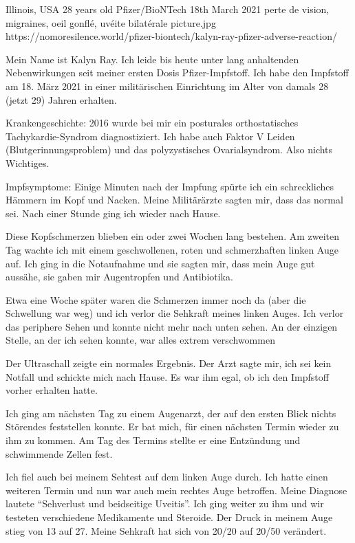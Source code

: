           {Illinois, USA}
          {28 years old}
          {Pfizer/BioNTech}
          {18th March 2021}
          {perte de vision, migraines, oeil gonflé, uvéite bilatérale}
          {picture.jpg}
          {https://nomoresilence.world/pfizer-biontech/kalyn-ray-pfizer-adverse-reaction/}
          {

\normalsize

Mein Name ist Kalyn Ray. Ich leide bis heute unter lang anhaltenden
Nebenwirkungen seit meiner ersten Dosis Pfizer-Impfstoff. Ich habe den Impfstoff
am 18. März 2021 in einer militärischen Einrichtung im Alter von damals 28
(jetzt 29) Jahren erhalten.

Krankengeschichte: 2016 wurde bei mir ein posturales orthostatisches
Tachykardie-Syndrom diagnostiziert. Ich habe auch Faktor V Leiden
(Blutgerinnungsproblem) und das polyzystisches Ovarialsyndrom. Also nichts
Wichtiges.

Impfsymptome: Einige Minuten nach der Impfung spürte ich ein schreckliches
Hämmern im Kopf und Nacken. Meine Militärärzte sagten mir, dass das normal
sei. Nach einer Stunde ging ich wieder nach Hause.

Diese Kopfschmerzen blieben ein oder zwei Wochen lang bestehen. Am zweiten Tag
wachte ich mit einem geschwollenen, roten und schmerzhaften linken Auge auf. Ich
ging in die Notaufnahme und sie sagten mir, dass mein Auge gut aussähe, sie
gaben mir Augentropfen und Antibiotika.

Etwa eine Woche später waren die Schmerzen immer noch da (aber die Schwellung
war weg) und ich verlor die Sehkraft meines linken Auges. Ich verlor das
periphere Sehen und konnte nicht mehr nach unten sehen. An der einzigen Stelle,
an der ich sehen konnte, war alles extrem verschwommen

Der Ultraschall zeigte ein normales Ergebnis. Der Arzt sagte mir, ich sei kein
Notfall und schickte mich nach Hause. Es war ihm egal, ob ich den Impfstoff
vorher erhalten hatte.

Ich ging am nächsten Tag zu einem Augenarzt, der auf den ersten Blick nichts
Störendes feststellen konnte. Er bat mich, für einen nächsten Termin wieder zu
ihm zu kommen. Am Tag des Termins stellte er eine Entzündung und schwimmende
Zellen fest.

Ich fiel auch bei meinem Sehtest auf dem linken Auge durch. Ich hatte einen
weiteren Termin und nun war auch mein rechtes Auge betroffen. Meine Diagnose
lautete “Sehverlust und beidseitige Uveitis”. Ich ging weiter zu ihm und wir
testeten verschiedene Medikamente und Steroide. Der Druck in meinem Auge stieg
von 13 auf 27. Meine Sehkraft hat sich von 20/20 auf 20/50 verändert.

}
